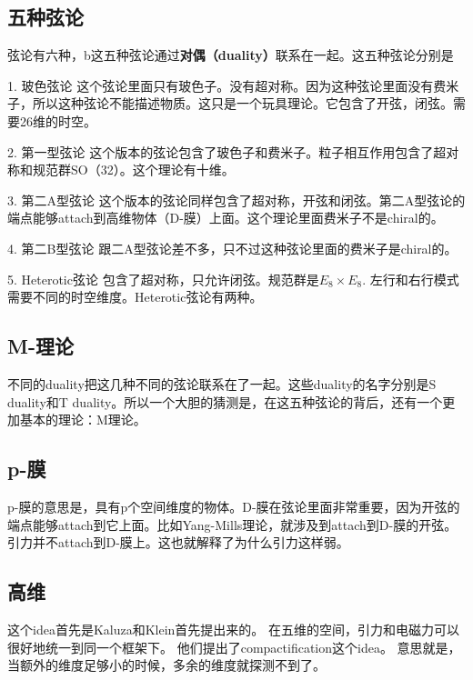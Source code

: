 
\begin{issues}
\issueNeedCite
\issueMissDepend
\end{issues}

\subsection{五种弦论}

弦论有六种，b这五种弦论通过\textbf{对偶（duality）}联系在一起。这五种弦论分别是

1. 玻色弦论
这个弦论里面只有玻色子。没有超对称。因为这种弦论里面没有费米子，所以这种弦论不能描述物质。这只是一个玩具理论。它包含了开弦，闭弦。需要26维的时空。

2. 第一型弦论
这个版本的弦论包含了玻色子和费米子。粒子相互作用包含了超对称和规范群SO（32）。这个理论有十维。

3. 第二A型弦论
这个版本的弦论同样包含了超对称，开弦和闭弦。第二A型弦论的端点能够attach到高维物体（D-膜）上面。这个理论里面费米子不是chiral的。

4. 第二B型弦论
跟二A型弦论差不多，只不过这种弦论里面的费米子是chiral的。

5. Heterotic弦论
包含了超对称，只允许闭弦。规范群是$E_8\times E_8$. 左行和右行模式需要不同的时空维度。Heterotic弦论有两种。

\subsection{M-理论}
不同的duality把这几种不同的弦论联系在了一起。这些duality的名字分别是S duality和T duality。所以一个大胆的猜测是，在这五种弦论的背后，还有一个更加基本的理论：M理论。

\subsection{p-膜}
p-膜的意思是，具有p个空间维度的物体。D-膜在弦论里面非常重要，因为开弦的端点能够attach到它上面。比如Yang-Mills理论，就涉及到attach到D-膜的开弦。 引力并不attach到D-膜上。这也就解释了为什么引力这样弱。

\subsection{高维}
这个idea首先是Kaluza和Klein首先提出来的。 在五维的空间，引力和电磁力可以很好地统一到同一个框架下。 他们提出了compactification这个idea。
意思就是，当额外的维度足够小的时候，多余的维度就探测不到了。 
